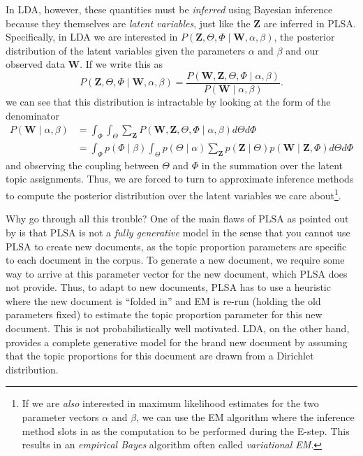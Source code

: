 \documentclass[11pt]{article}
\begin{document}
In LDA, however, these quantities must be \emph{inferred} using Bayesian
inference because they themselves are \emph{latent variables}, just like
the $\mathbf{Z}$ are inferred in PLSA. Specifically, in LDA we are
interested in $P(\mathbf{Z}, \Theta, \Phi \mid \mathbf{W}, \alpha, \beta)$,
the posterior distribution of the latent variables given the parameters
$\alpha$ and $\beta$ and our observed data $\mathbf{W}$. If we write this
as
\begin{equation}
  P(\mathbf{Z}, \Theta, \Phi \mid \textbf{W}, \alpha, \beta) = \frac{P(\mathbf{W}, \mathbf{Z},
  \Theta, \Phi \mid \alpha, \beta)}{P(\mathbf{W} \mid \alpha, \beta)}.
\end{equation}
we can see that this distribution is intractable by looking at the form of
the denominator
\begin{align*}
  P(\mathbf{W} \mid \alpha, \beta)
  &=
  \int_\Phi
  \int_\Theta
  \sum_\mathbf{Z}
  P(\mathbf{W}, \mathbf{Z}, \Theta, \Phi \mid \alpha, \beta)
  d\Theta
  d\Phi\\
  &=
  \int_\Phi
  p(\Phi \mid \beta)
  \int_\Theta
  p(\Theta \mid \alpha)
  \sum_{\mathbf{Z}}
  p(\mathbf{Z} \mid \Theta)
  p(\mathbf{W} \mid \mathbf{Z}, \Phi)
  d\Theta
  d\Phi
\end{align*}
and observing the coupling between $\Theta$ and $\Phi$ in the summation
over the latent topic assignments. Thus, we are forced to turn to
approximate inference methods to compute the posterior distribution over
the latent variables we care about\footnote{If we are \emph{also}
interested in maximum likelihood estimates for the two parameter vectors
$\alpha$ and $\beta$, we can use the EM algorithm where the inference
method slots in as the computation to be performed during the E-step.
This results in an \emph{empirical Bayes} algorithm
often called \emph{variational EM}.}.

Why go through all this trouble? One of the main flaws of PLSA as pointed
out by \citet{Blei:2003:LDA} is that PLSA is not a \emph{fully generative}
model in the sense that you cannot use PLSA to create new documents, as the
topic proportion parameters are specific to each document in the corpus. To
generate a new document, we require some way to arrive at this parameter
vector for the new document, which PLSA does not provide. Thus, to adapt to
new documents, PLSA has to use a heuristic where the new document is
``folded in'' and EM is re-run (holding the old parameters fixed) to
estimate the topic proportion parameter for this new document. This is not
probabilistically well motivated. LDA, on the other hand, provides a
complete generative model for the brand new document by assuming that the
topic proportions for this document are drawn from a Dirichlet
distribution.
\end{document}
